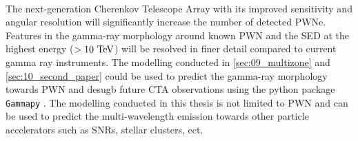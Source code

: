 \par~\par
The next-generation Cherenkov Telescope Array with its improved sensitivity and angular resolution \citep{2019scta.book.....C} will significantly increase the number of detected PWNe. Features in the gamma-ray morphology around known PWN and the SED at the highest energy ($>10~\TeV$) will be resolved in finer detail compared to current gamma ray instruments. The modelling conducted in \autoref{sec:09_multizone} and \autoref{sec:10_second_paper} could be used to predict the gamma-ray morphology towards PWN and desugb future CTA observations using the python package {\tt Gammapy} \citep{gammapy:2017}. The modelling conducted in this thesis is not limited to PWN and can be used to predict the multi-wavelength emission towards other particle accelerators such as SNRs, stellar clusters, ect.